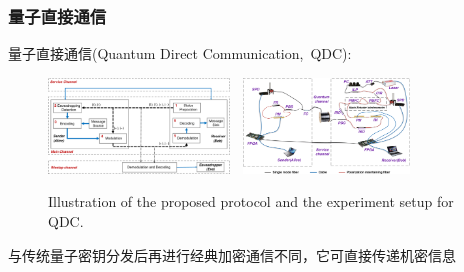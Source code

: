 \begin{frame}
    \frametitle{量子直接通信}
	    量子直接通信\textrm{(Quantum Direct Communication,~QDC)}:\\
		    {\fontsize{7.5pt}{5.2pt}\selectfont{由清华大学龙桂鲁团队原创提出的一种不依赖于传统密钥分发的量子通信方式，能直接在通信双方之间传输信息}}
    \begin{figure}
        \centering
                \includegraphics[height=1.0in, width=1.9in, viewport=0 0 1334 705,clip]{Figures/Illustration-of-the-proposed_protocol-for-QDC.png}
                \includegraphics[height=1.0in, width=1.9in, viewport=0 0 1348 777,clip]{Figures/Illustration-of-experiment-setup-for-QDC.png}
		\caption{\tiny{\textrm{Illustration of the proposed protocol and the experiment setup for QDC.}}}
		\label{Fig:Illustration-of-experiment-setup-for-QDC}
    \end{figure}
    \vskip -10pt
		    与传统量子密钥分发后再进行经典加密通信不同，它可直接传递机密信息
\end{frame}

